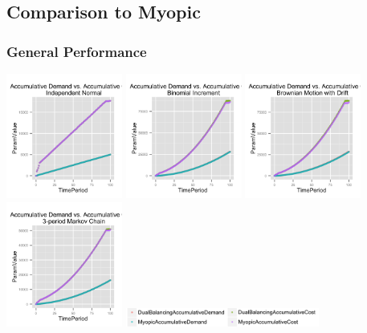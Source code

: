 \documentclass[twoside]{article}
\begin{document}
\begin{multicols}{2}
\subsection{Comparison to Myopic}
\subsubsection{General Performance}

  \includegraphics[width=1.5in]{figures/AccumulativeDemandAndCost_Normal.png}
  \includegraphics[width=1.5in]{figures/AccumulativeDemandAndCost_Binomial.png}
  \includegraphics[width=1.5in]{figures/AccumulativeDemandAndCost_Brownian.png}
  \includegraphics[width=1.5in]{figures/AccumulativeDemandAndCost_Markov.png}
  \includegraphics[width=2.5in]{figures/key.png}


\end{multicols}
\end{document}
